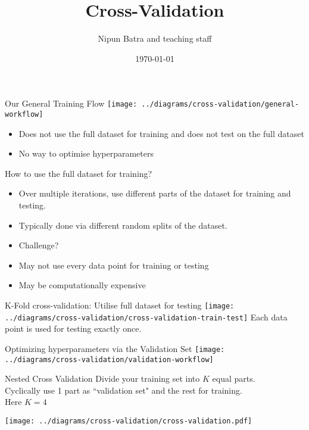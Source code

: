 \documentclass[usenames,dvipsnames]{beamer}
\title{Cross-Validation}
\date{\today}
\author{Nipun Batra and teaching staff}
\institute{IIT Gandhinagar}
\begin{document}
	\maketitle
	
	


\begin{frame}{Our General Training Flow}
\texttt{[image: ../diagrams/cross-validation/general-workflow]}
\begin{itemize}
	\item \pause Does not use the full dataset for training and does not test on the full dataset
	\item \pause No way to optimise hyperparameters
\end{itemize}
\end{frame}

\begin{frame}{How to use the full dataset for training?}
\begin{itemize}
	\item \pause Over multiple iterations, use different parts of the dataset for training and testing.
	\item \pause Typically done via different random splits of the dataset.
	\item \pause Challenge?
	\item \pause May not use every data point for training or testing
	\item \pause May be computationally expensive

\end{itemize}
	
\end{frame}

\begin{frame}{K-Fold cross-validation: Utilise full dataset for testing}
\texttt{[image: ../diagrams/cross-validation/cross-validation-train-test]}
\pause Each data point is used for testing exactly once.
\end{frame}

\begin{frame}{Optimizing hyperparameters via the Validation Set}
\texttt{[image: ../diagrams/cross-validation/validation-workflow]}
\end{frame}

\begin{frame}{Nested Cross Validation}
Divide your training set into $K$ equal 	parts.\\
Cyclically use 1 part as ``validation set" and the rest for training.\\
Here $K = 4$
\begin{center}
\texttt{[image: ../diagrams/cross-validation/cross-validation.pdf]}
\end{center}
\end{frame}
\end{document}
